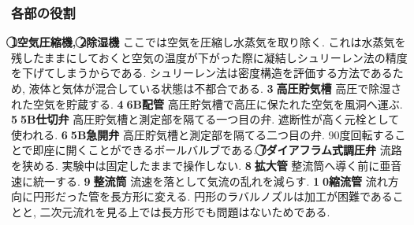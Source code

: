 \documentclass[12pt]{jsarticle}
\begin{document}
\subsubsection{各部の役割}
\noindent
{\bf \textcircled{\scriptsize1}空気圧縮機, \textcircled{\scriptsize2}除湿機} \newline
ここでは空気を圧縮し水蒸気を取り除く. これは水蒸気を残したままにしておくと空気の温度が下がった際に凝結しシュリーレン法の精度を下げてしまうからである. シュリーレン法は密度構造を評価する方法であるため, 液体と気体が混合している状態は不都合である. \newline \newline
{\bf \textcircled{\scriptsize3}高圧貯気槽} \newline
高圧で除湿された空気を貯蔵する. \newline\newline
{\bf \textcircled{\scriptsize4}6B配管} \newline
高圧貯気槽で高圧に保たれた空気を風洞へ運ぶ. \newline\newline
{\bf \textcircled{\scriptsize5}5B仕切弁} \newline
高圧貯気槽と測定部を隔てる一つ目の弁. 遮断性が高く元栓として使われる. \newline\newline
{\bf \textcircled{\scriptsize6}5B急開弁} \newline
高圧貯気槽と測定部を隔てる二つ目の弁. 90度回転することで即座に開くことができるボールバルブである. \newline\newline
{\bf \textcircled{\scriptsize7}ダイアフラム式調圧弁} \newline
流路を狭める. 実験中は固定したままで操作しない. \newline\newline
{\bf \textcircled{\scriptsize8}拡大管} \newline
整流筒へ導く前に亜音速に統一する. \newline\newline
{\bf \textcircled{\scriptsize9}整流筒} \newline
流速を落として気流の乱れを減らす. \newline\newline
{\bf \textcircled{\scriptsize10}縮流管} \newline
流れ方向に円形だった管を長方形に変える. 円形のラバルノズルは加工が困難であることと, 二次元流れを見る上では長方形でも問題はないためである. \newline \newline
\end{document}
